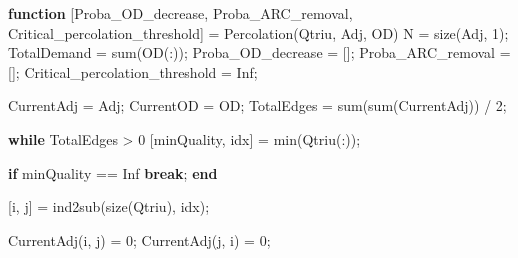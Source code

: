 \documentclass[
  letterpaper,
  DIV=11,
  numbers=noendperiod]{scrartcl}
\newenvironment{Shaded}{\begin{snugshade}}{\end{snugshade}}
\newcommand{\FloatTok}[1]{\textcolor[rgb]{0.68,0.00,0.00}{#1}}
\newcommand{\KeywordTok}[1]{\textcolor[rgb]{0.00,0.23,0.31}{\textbf{#1}}}
\newcommand{\NormalTok}[1]{\textcolor[rgb]{0.00,0.23,0.31}{#1}}
\newcommand{\OperatorTok}[1]{\textcolor[rgb]{0.37,0.37,0.37}{#1}}
\newcommand{\VariableTok}[1]{\textcolor[rgb]{0.07,0.07,0.07}{#1}}
\begin{document}
\begin{Shaded}
\begin{Highlighting}[]
\KeywordTok{function}\NormalTok{ [}\VariableTok{Proba\_OD\_decrease}\OperatorTok{,} \VariableTok{Proba\_ARC\_removal}\OperatorTok{,} \VariableTok{Critical\_percolation\_threshold}\NormalTok{] }\OperatorTok{=} \VariableTok{Percolation}\NormalTok{(}\VariableTok{Qtriu}\OperatorTok{,} \VariableTok{Adj}\OperatorTok{,} \VariableTok{OD}\NormalTok{)}
    \VariableTok{N} \OperatorTok{=} \VariableTok{size}\NormalTok{(}\VariableTok{Adj}\OperatorTok{,} \FloatTok{1}\NormalTok{)}\OperatorTok{;}
    \VariableTok{TotalDemand} \OperatorTok{=} \VariableTok{sum}\NormalTok{(}\VariableTok{OD}\NormalTok{(}\OperatorTok{:}\NormalTok{))}\OperatorTok{;}
    \VariableTok{Proba\_OD\_decrease} \OperatorTok{=}\NormalTok{ []}\OperatorTok{;}
    \VariableTok{Proba\_ARC\_removal} \OperatorTok{=}\NormalTok{ []}\OperatorTok{;}
    \VariableTok{Critical\_percolation\_threshold} \OperatorTok{=} \VariableTok{Inf}\OperatorTok{;}

    \VariableTok{CurrentAdj} \OperatorTok{=} \VariableTok{Adj}\OperatorTok{;}
    \VariableTok{CurrentOD} \OperatorTok{=} \VariableTok{OD}\OperatorTok{;}
    \VariableTok{TotalEdges} \OperatorTok{=} \VariableTok{sum}\NormalTok{(}\VariableTok{sum}\NormalTok{(}\VariableTok{CurrentAdj}\NormalTok{)) }\OperatorTok{/} \FloatTok{2}\OperatorTok{;}

    \KeywordTok{while} \VariableTok{TotalEdges} \OperatorTok{\textgreater{}} \FloatTok{0}
\NormalTok{        [}\VariableTok{minQuality}\OperatorTok{,} \VariableTok{idx}\NormalTok{] }\OperatorTok{=} \VariableTok{min}\NormalTok{(}\VariableTok{Qtriu}\NormalTok{(}\OperatorTok{:}\NormalTok{))}\OperatorTok{;}

        \KeywordTok{if} \VariableTok{minQuality} \OperatorTok{==} \VariableTok{Inf}
            \KeywordTok{break}\OperatorTok{;}
        \KeywordTok{end}

\NormalTok{        [}\VariableTok{i}\OperatorTok{,} \VariableTok{j}\NormalTok{] }\OperatorTok{=} \VariableTok{ind2sub}\NormalTok{(}\VariableTok{size}\NormalTok{(}\VariableTok{Qtriu}\NormalTok{)}\OperatorTok{,} \VariableTok{idx}\NormalTok{)}\OperatorTok{;}

        \VariableTok{CurrentAdj}\NormalTok{(}\VariableTok{i}\OperatorTok{,} \VariableTok{j}\NormalTok{) }\OperatorTok{=} \FloatTok{0}\OperatorTok{;}
        \VariableTok{CurrentAdj}\NormalTok{(}\VariableTok{j}\OperatorTok{,} \VariableTok{i}\NormalTok{) }\OperatorTok{=} \FloatTok{0}\OperatorTok{;}


\end{Highlighting}
\end{Shaded}
\end{document}
